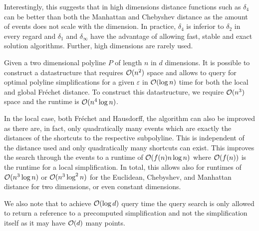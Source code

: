 Interestingly, this suggests that in high dimensions distance functions such as \(\delta_4\) can be better than both the Manhattan and Chebyshev distance as the amount of events does not scale with the dimension. In practice, \(\delta_4\) is inferior to \(\delta_2\) in every regard and \(\delta_1\) and \(\delta_\infty\) have the advantage of allowing fast, stable and exact solution algorithms. Further, high dimensions are rarely used.

\begin{corollary}
	Given a two dimensional polyline \(P\) of length \(n\) in \(d\) dimensions. It is possible to construct a datastructure that requires \(\mathcal{O}(n^2)\) space and allows to query for optimal polyline simplifications for a given \(\varepsilon\) in \(\mathcal{O}(\log n)\) time for both the local and global Fréchet distance. To construct this datastructure, we require \(\mathcal{O}(n^3)\) space and the runtime is \(\mathcal{O}(n^4 \log n)\).
\end{corollary}

In the local case, both Fréchet and Hausdorff, the algorithm can also be improved as there are, in fact, only quadratically many events which are exactly the distances of the shortcuts to the respective subpolyline. This is independent of the distance used and only quadratically many shortcuts can exist. This improves the search through the events to a runtime of \(\mathcal{O}(f(n)n\log n)\) where \(\mathcal{O}(f(n))\) is the runtime for a local simplification. In total, this allows also for runtimes of \(\mathcal{O}(n^3\log n)\) or \(\mathcal{O}(n^3\log^2 n)\) for the Euclidean, Chebyshev, and Manhattan distance for two dimensions, or even constant dimensions.



We also note that to achieve \(\mathcal{O}(\log d)\) query time the query search is only allowed to return a reference to a precomputed simplification and not the simplification itself as it may have \(\mathcal{O}(d)\) many points. 

